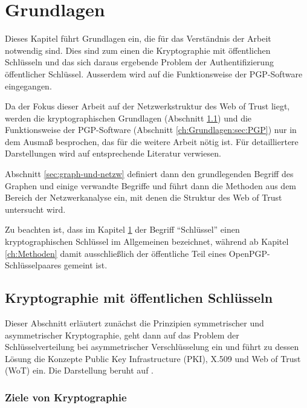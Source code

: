 
\chapter{Grundlagen}
\label{ch:Grundlagen}

Dieses Kapitel führt Grundlagen ein, die für das Verständnis der
Arbeit notwendig sind. Dies sind zum einen die Kryptographie mit
öffentlichen Schlüsseln und das sich daraus ergebende Problem der
Authentifizierung öffentlicher Schlüssel. Ausserdem wird auf die
Funktionsweise der PGP-Software eingegangen.

Da der Fokus dieser Arbeit auf der Netzwerkstruktur des Web of Trust
liegt, werden die kryptographischen Grundlagen (Abschnitt
\ref{ch:Grundlagen:sec:PublicKeyCrypto}) und die Funktionsweise
der PGP-Software (Abschnitt \ref{ch:Grundlagen:sec:PGP}) nur in dem Ausmaß besprochen, das für die weitere
Arbeit nötig ist. Für detailliertere Darstellungen wird auf
entsprechende Literatur verwiesen.

Abschnitt \ref{sec:graph-und-netzw} definiert dann den
grundlegenden Begriff des Graphen und einige verwandte Begriffe und
führt dann die Methoden aus dem Bereich der Netzwerkanalyse ein, mit
denen die Struktur des Web of Trust untersucht wird.

Zu beachten ist, dass im Kapitel \ref{ch:Grundlagen} der Begriff
``Schlüssel'' einen kryptographischen Schlüssel im Allgemeinen
bezeichnet, während ab Kapitel \ref{ch:Methoden} damit
ausschließlich der öffentliche Teil eines OpenPGP-Schlüsselpaares
gemeint ist.

\section{Kryptographie mit öffentlichen Schlüsseln}
\label{ch:Grundlagen:sec:PublicKeyCrypto}

Dieser Abschnitt erläutert zunächst die Prinzipien symmetrischer
und asymmetrischer Kryptographie, geht dann auf das Problem der
Schlüsselverteilung bei asymmetrischer Verschlüsselung ein und
führt zu dessen Lösung die Konzepte Public Key Infrastructure
(PKI), X.509 und Web of Trust (WoT) ein. Die Darstellung beruht auf
\cite{Menezes1996}.

\subsection{Ziele von Kryptographie}
\label{sec:ziele-von-krypt}

